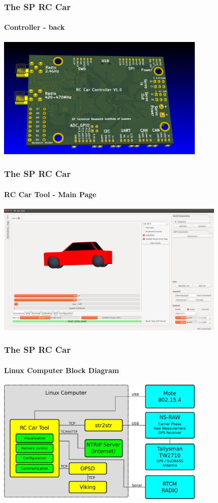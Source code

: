 \documentclass[aspectratio=169,electronics,notopline]{beamer}
\begin{document}
\begin{frame} 
\frametitle{The SP RC Car}
\framesubtitle{Controller - back}
\begin{center}
	\includegraphics[width=10cm]{Figures/controller_back.png}
\end{center}
\end{frame}

\begin{frame} 
\frametitle{The SP RC Car}
\framesubtitle{RC Car Tool - Main Page}
\begin{center}
	\includegraphics[width=11cm]{Figures/GUI/car_orientation.png}
\end{center}
\end{frame}

\begin{frame} 
\frametitle{The SP RC Car}
\framesubtitle{Linux Computer Block Diagram}
\begin{center}
	\includegraphics[width=10cm]{Figures/linux_diagram.pdf}
\end{center}
\end{frame}
\end{document}
